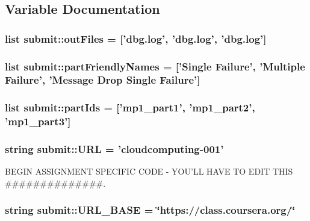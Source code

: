 \subsection{\-Variable \-Documentation}
\hypertarget{namespacesubmit_ac34f5696b666b7b9f228f4f2db840665}{
\subsubsection[{out\-Files}]{\setlength{\rightskip}{0pt plus 5cm}list {\bf submit\-::out\-Files} = \mbox{[}'dbg.\-log', 'dbg.\-log', 'dbg.\-log'\mbox{]}}}\label{df/d89/namespacesubmit_ac34f5696b666b7b9f228f4f2db840665}
\hypertarget{namespacesubmit_aad9d310b50dab3e04693fd64f8a1db0a}{
\subsubsection[{part\-Friendly\-Names}]{\setlength{\rightskip}{0pt plus 5cm}list {\bf submit\-::part\-Friendly\-Names} = \mbox{[}'\-Single \-Failure', '\-Multiple \-Failure', '\-Message \-Drop \-Single \-Failure'\mbox{]}}}\label{df/d89/namespacesubmit_aad9d310b50dab3e04693fd64f8a1db0a}
\hypertarget{namespacesubmit_af617414255c96fb7cd902a9d8ddad163}{
\subsubsection[{part\-Ids}]{\setlength{\rightskip}{0pt plus 5cm}list {\bf submit\-::part\-Ids} = \mbox{[}'mp1\-\_\-part1', 'mp1\-\_\-part2', 'mp1\-\_\-part3'\mbox{]}}}\label{df/d89/namespacesubmit_af617414255c96fb7cd902a9d8ddad163}
\hypertarget{namespacesubmit_a4253b4ce2e1ffd16b9c754ac6e24c60c}{
\subsubsection[{\-U\-R\-L}]{\setlength{\rightskip}{0pt plus 5cm}string {\bf submit\-::\-U\-R\-L} = 'cloudcomputing-\/001'}}\label{df/d89/namespacesubmit_a4253b4ce2e1ffd16b9c754ac6e24c60c}


\-B\-E\-G\-I\-N \-A\-S\-S\-I\-G\-N\-M\-E\-N\-T \-S\-P\-E\-C\-I\-F\-I\-C \-C\-O\-D\-E -\/ \-Y\-O\-U'\-L\-L \-H\-A\-V\-E \-T\-O \-E\-D\-I\-T \-T\-H\-I\-S \#\#\#\#\#\#\#\#\#\#\#\#\#\#. 

\hypertarget{namespacesubmit_a6d5db22d9667cf8ff8d88a7680b3e80c}{
\subsubsection[{\-U\-R\-L\-\_\-\-B\-A\-S\-E}]{\setlength{\rightskip}{0pt plus 5cm}string {\bf submit\-::\-U\-R\-L\-\_\-\-B\-A\-S\-E} = \char`\"{}https\-://class.\-coursera.\-org/\char`\"{}}}\label{df/d89/namespacesubmit_a6d5db22d9667cf8ff8d88a7680b3e80c}
